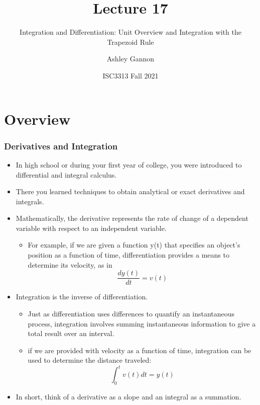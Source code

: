 \documentclass{if-beamer}
\title[Lecture 17]{Lecture 17}
\subtitle{Integration and Differentiation: Unit Overview and Integration with the Trapezoid Rule}
\author{Ashley Gannon}
\date{ISC3313 Fall 2021}
\begin{document}
\begin{frame}
  \titlepage
\end{frame}
\section{Overview}

\begin{frame}
\frametitle{Derivatives and Integration}
\begin{itemize}
	\item In high school or during your first year of college, you were introduced to differential and
	integral calculus.
	\item There you learned techniques to obtain analytical or exact derivatives
	and integrals.
	\item Mathematically, the derivative represents the rate of change of a dependent variable with respect to an independent variable.
	\begin{itemize}
		\item For example, if we are given a function y(t) that
		specifies an object’s position as a function of time, differentiation provides a means to
		determine its velocity, as in
		$$\frac{dy(t)}{dt} = v(t)$$
	\end{itemize}
	\item Integration is the inverse of differentiation.
	\begin{itemize}
		\item Just as differentiation uses differences to quantify an instantaneous
		process, integration involves summing instantaneous information to give a total result over an interval.
		\item if we are provided with velocity as a function of time, integration can be used to determine the distance traveled:
		$$\int_{0}^{t} v(t)dt = y(t)$$ 
	\end{itemize}
	\item In short, think of a derivative as a slope and an integral as a summation.
\end{itemize} 
\end{frame}
\end{document}
